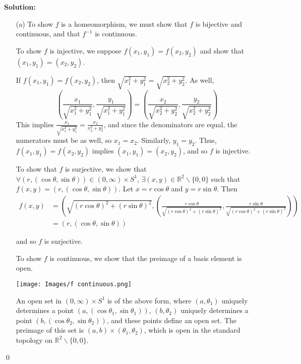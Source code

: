 \documentclass[11pt]{article}
\newenvironment{solution}{\textbf{Solution:}}{\qed\newpage}
\newcommand{\R}{\mathbb{R}}
\newcommand{\sk}{\smallskip}
\begin{document}
\begin{solution}
    \begin{itemize}
        \item[(a)] To show $f$ is a homeomorphism, we must show that $f$ is bijective and continuous, and that $f^{-1}$ is continuous. 

        \sk

        To show $f$ is injective, we suppose $f(x_1, y_1) = f(x_2, y_2)$ and show that $(x_1, y_1) = (x_2, y_2)$.

        \sk

        If $f(x_1, y_1) = f(x_2, y_2)$, then $\sqrt{x_1^2 + y_1^2} = \sqrt{x_2^2 + y_2^2}$. As well, $$\left(\frac{x_1}{\sqrt{x_1^2 + y_1^2}}, \frac{y_1}{\sqrt{x_1^2 + y_1^2}}\right) = \left(\frac{x_2}{\sqrt{x_2^2 + y_2^2}}, \frac{y_2}{\sqrt{x_2^2 + y_2^2}}\right)$$ This implies $\frac{x_1}{\sqrt{x_1^2 + y_1^2}} = \frac{x_2}{x_2^2 + y_2^2}$, and since the denominators are equal, the numerators must be as well, so $x_1 = x_2$. Similarly, $y_1 = y_2$. Thus, $f(x_1, y_1) = f(x_2, y_2)$ implies $(x_1, y_1) = (x_2, y_2)$, and so $f$ is injective. 

        \sk

        To show that $f$ is surjective, we show that $\forall (r, (\cos \theta, \sin \theta)) \in (0, \infty) \times S^1$, $\exists (x, y) \in \R^2 \backslash \{0, 0\}$ such that $f(x, y) = (r, (\cos \theta, \sin \theta))$. Let $x = r \cos \theta$ and $y = r \sin \theta$. Then \begin{align*}
            f(x, y) &= \left(\sqrt{(r\cos\theta)^2 + (r\sin\theta)^2}, \left(\frac{r\cos\theta}{\sqrt{(r\cos\theta)^2 + (r\sin\theta)^2}}, \frac{r\sin\theta}{\sqrt{(r\cos\theta)^2 + (r\sin\theta)^2}}\right)\right) \\
            &= \left(r, (\cos\theta, \sin\theta)\right)
        \end{align*}

        and so $f$ is surjective.

        \sk

        To show $f$ is continuous, we show that the preimage of a basis element is open. 
        \begin{center}
            \texttt{[image: Images/f continuous.png]}
        \end{center}

        An open set in $(0, \infty) \times S^1$ is of the above form, where $(a, \theta_1)$ uniquely determines a point $(a, (\cos\theta_1, \sin\theta_1))$, $(b, \theta_2)$ uniquely determines a point $(b, (\cos\theta_2, \sin\theta_2))$, and these points define an open set. The preimage of this set is $(a, b) \times (\theta_1, \theta_2)$, which is open in the standard topology on $\R^2\backslash\{0, 0\}$. 


\end{itemize}
\end{solution}
\end{document}
